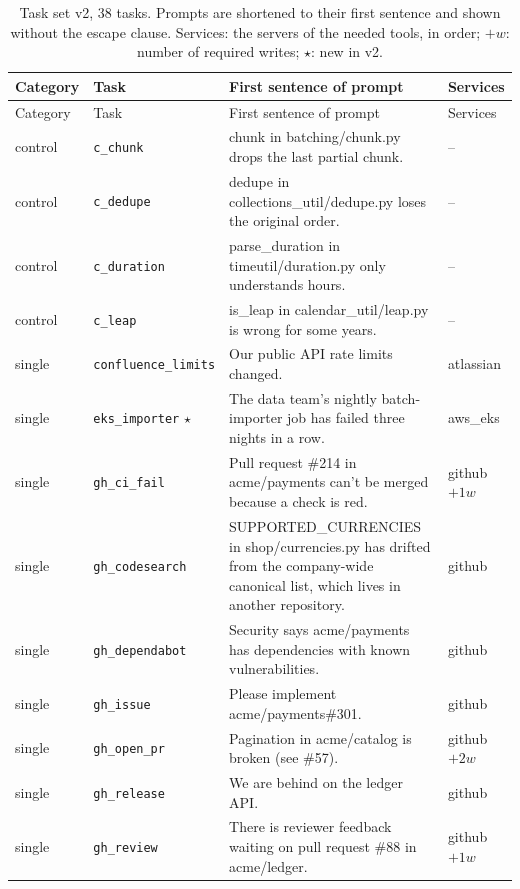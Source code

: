 \begin{longtable}{@{}>{\raggedright\arraybackslash}p{1.4cm}>{\raggedright\arraybackslash}p{2.6cm}>{\raggedright\arraybackslash}p{7.1cm}>{\raggedright\arraybackslash}p{2.4cm}@{}}
\caption{Task set v2, 38 tasks. Prompts are shortened to their first sentence and shown without the escape clause. Services: the servers of the needed tools, in order; $+w$: number of required writes; $\star$: new in v2.}\label{tab:tasks_v2}\\
\toprule Category & Task & First sentence of prompt & Services \\ \midrule\endfirsthead
\toprule Category & Task & First sentence of prompt & Services \\ \midrule\endhead
control & \texttt{c\_chunk} & chunk in batching/chunk.py drops the last partial chunk. & -- \\
control & \texttt{c\_dedupe} & dedupe in collections\_util/dedupe.py loses the original order. & -- \\
control & \texttt{c\_duration} & parse\_duration in timeutil/duration.py only understands hours. & -- \\
control & \texttt{c\_leap} & is\_leap in calendar\_util/leap.py is wrong for some years. & -- \\
single & \texttt{confluence\_limits} & Our public API rate limits changed. & atlassian \\
single & \texttt{eks\_importer} $\star$ & The data team's nightly batch-importer job has failed three nights in a row. & aws\_eks \\
single & \texttt{gh\_ci\_fail} & Pull request \#214 in acme/payments can't be merged because a check is red. & github $+1w$ \\
single & \texttt{gh\_codesearch} & SUPPORTED\_CURRENCIES in shop/currencies.py has drifted from the company-wide canonical list, which lives in another repository. & github \\
single & \texttt{gh\_dependabot} & Security says acme/payments has dependencies with known vulnerabilities. & github \\
single & \texttt{gh\_issue} & Please implement acme/payments\#301. & github \\
single & \texttt{gh\_open\_pr} & Pagination in acme/catalog is broken (see \#57). & github $+2w$ \\
single & \texttt{gh\_release} & We are behind on the ledger API. & github \\
single & \texttt{gh\_review} & There is reviewer feedback waiting on pull request \#88 in acme/ledger. & github $+1w$ \\

\end{longtable}
